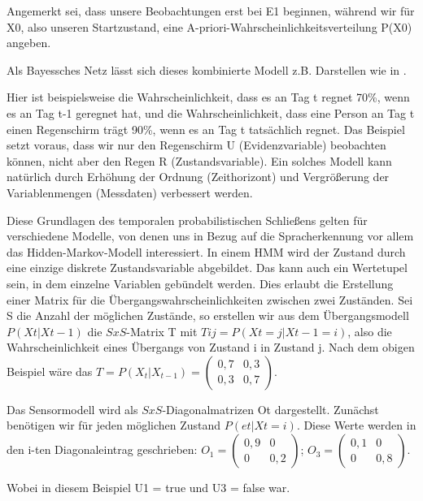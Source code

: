 Angemerkt sei, dass unsere Beobachtungen erst bei E1 beginnen, während wir für X0, also unseren Startzustand, eine A-priori-Wahrscheinlichkeitsverteilung P(X0) angeben.

Als Bayessches Netz lässt sich dieses kombinierte Modell z.B. Darstellen wie in \cite[S. 665]{russelnorvig}.

Hier ist beispielsweise die Wahrscheinlichkeit, dass es an Tag t regnet 70\%, wenn es an Tag t-1 geregnet hat, und die Wahrscheinlichkeit, dass eine Person an Tag t einen Regenschirm trägt 90\%, wenn es an Tag t tatsächlich regnet.
Das Beispiel setzt voraus, dass wir nur den Regenschirm U (Evidenzvariable) beobachten können, nicht aber den Regen R (Zustandsvariable).
Ein solches Modell kann natürlich durch Erhöhung der Ordnung (Zeithorizont) und Vergrößerung der Variablenmengen (Messdaten) verbessert werden.

Diese Grundlagen des temporalen probabilistischen Schließens gelten für verschiedene Modelle, von denen uns in Bezug auf die Spracherkennung vor allem das Hidden-Markov-Modell interessiert.
In einem HMM wird der Zustand durch eine einzige diskrete Zustandsvariable abgebildet.
Das kann auch ein Wertetupel sein, in dem einzelne Variablen gebündelt werden.
Dies erlaubt die Erstellung einer Matrix für die Übergangswahrscheinlichkeiten zwischen zwei Zuständen.
Sei S die Anzahl der möglichen Zustände, so erstellen wir aus dem Übergangsmodell $P( Xt | Xt-1 )$ die $S x S$-Matrix T mit $Tij = P(Xt = j | Xt-1 = i)$, also die Wahrscheinlichkeit eines Übergangs von Zustand i in Zustand j.
Nach dem obigen Beispiel wäre das $T = P(X_t | X_{t-1}) =
\begin{pmatrix}
0,7 & 0,3 \\
0,3 & 0,7
\end{pmatrix}$.

Das Sensormodell wird als $S x S$-Diagonalmatrizen Ot dargestellt.
Zunächst benötigen wir für jeden möglichen Zustand $P( et | Xt = i )$.
Diese Werte werden in den i-ten Diagonaleintrag geschrieben:
$O_1 = \begin{pmatrix}
0,9 & 0 \\
0 & 0,2
\end{pmatrix}$;
$O_3 = \begin{pmatrix}
0,1 & 0 \\
0 & 0,8
\end{pmatrix}$.

Wobei in diesem Beispiel U1 = true und U3 = false war.

